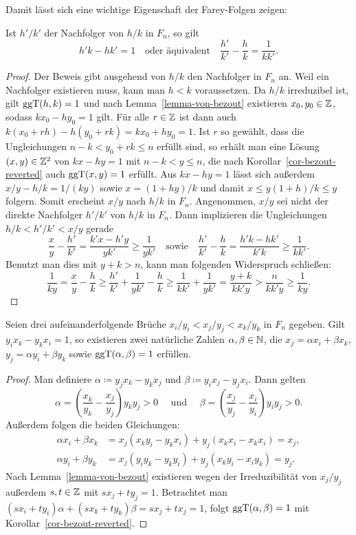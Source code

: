 Damit lässt sich eine wichtige Eigenschaft der Farey-Folgen zeigen:
\begin{lemma}\label{lemma-basic-property-farey-successor}
	Ist $h'/k'$ der Nachfolger von $h/k$ in $F_n$, so gilt \[
	h'k - hk' = 1 \text{~~~oder äquivalent~~~} \frac{h'}{k'} - \frac{h}{k} = \frac{1}{kk'}.
	\]
\end{lemma}
\begin{proof}
	Der Beweis gibt ausgehend von $h/k$ den Nachfolger in $F_n$ an.
	Weil ein Nachfolger existieren muss, kann man $h<k$ voraussetzen.
	Da $h/k$ irreduzibel ist, gilt $\operatorname{ggT}(h,k)= 1$ und nach Lemma~\ref{lemma-von-bezout} existieren $x_0, y_0\in\mathbb{Z}$, sodass $kx_0 -hy_0 = 1$ gilt.
	Für alle $r\in\mathbb{Z}$ ist dann auch $k(x_0 + rh) - h(y_0 + rk) = k x_0 + hy_0 = 1$.
	Ist $r$ so gewählt, dass die Ungleichungen $n-k<y_0 +rk \leq n$ erfüllt sind, so erhält man eine Lösung $(x,y)\in\mathbb{Z}^2$ von $kx - hy = 1$ mit $n-k<y\leq n$, die nach Korollar~\ref{cor-bezout-reverted} auch $\operatorname{ggT}(x,y)=1$ erfüllt.
	Aus $kx-hy=1$ lässt sich außerdem $x/y - h/k = 1/(ky)$ sowie $x = (1+hy)/k$ und damit $x \leq y(1+h)/k \leq y$ folgern.
	Somit erscheint $x/y$ nach $h/k$ in $F_n$.
	Angenommen, $x/y$ sei nicht der direkte Nachfolger $h'/k'$ von $h/k$ in $F_n$.
	Dann implizieren die Ungleichungen $h/k < h'/k' < x/y$ gerade \[
	\frac{x}{y} - \frac{h'}{k'} = \frac{k'x-h'y}{yk'} \geq \frac{1}{yk'}\text{~~~sowie~~~} \frac{h'}{k'} - \frac{h}{k} = \frac{h'k - hk'}{k'k} \geq \frac{1}{kk'}. \]
	Benutzt man dies mit $y+k > n$, kann man folgenden Widerspruch schließen:
	\[
		\frac{1}{ky} = \frac{x}{y} - \frac{h}{k} \geq \frac{h'}{k'} + \frac{1}{yk'}- \frac{h}{k} \geq \frac{1}{kk'} + \frac{1}{yk'} = \frac{y+k}{kk'y} > \frac{n}{kk'y} \geq \frac{1}{ky}.
	\]
	\vspace{-0.5em}
\end{proof}

\begin{lemma}\label{lemma-farey-middle-member}
	Seien drei aufeinanderfolgende Brüche $x_i/y_i < x_j / y_j < x_k / y_k$ in $F_n$ gegeben.
	Gilt $y_i x_k - y_k x_i = 1$, so existieren zwei natürliche Zahlen $\alpha,\beta\in\mathbb{N}$, die $x_j = \alpha x_i + \beta x_k$, $y_j = \alpha y_i + \beta y_k$ sowie $\operatorname{ggT}(\alpha, \beta)=1$ erfüllen.
\end{lemma}
\begin{proof}
	Man definiere $\alpha\coloneq y_j x_k - y_k x_j$ und $\beta\coloneq y_i x_j - y_j x_i$.
	Dann gelten 
	\[
	\alpha = \left(\frac{x_k}{y_k} - \frac{x_j}{y_j}\right) y_k y_j > 0 \text{~~~ und ~~~} \beta = \left( \frac{x_j}{y_j} - \frac{x_i}{y_i} \right) y_i y_j > 0.
	\]
	Außerdem folgen die beiden Gleichungen:
	\begin{align*}
	\alpha x_i + \beta x_k &= x_j(x_k y_i - y_k x_i ) + y_j (x_k x_i - x_k x_i) = x_j, \\[1em]
	\alpha y_i + \beta y_k &= x_j (y_i y_k - y_k y_i) + y_j (x_k y_i - x_i y_k) = y_j.
	\end{align*}
	Nach Lemma~\ref{lemma-von-bezout} existieren wegen der Irreduzibilität von $x_j/y_j$ außerdem $s,t\in\mathbb{Z}$ mit $sx_j + ty_j = 1$.
	Betrachtet man $(sx_i + ty_i)\alpha + (sx_k + ty_k)\beta = s x_j + t x_j = 1$, folgt $\operatorname{ggT}(\alpha, \beta) = 1$ mit Korollar~\ref{cor-bezout-reverted}.
\end{proof}

